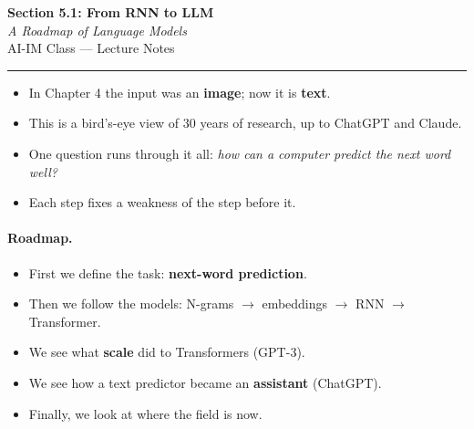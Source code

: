 \documentclass[12pt, a4paper]{article}
\begin{document}
\begin{center}
  {\LARGE \textbf{Section 5.1: From RNN to LLM}} \\[0.3em]
  {\large\itshape A Roadmap of Language Models} \\[0.5em]
  {\large AI-IM Class --- Lecture Notes}%
  \ifstudentmode
  \fi
\end{center}

\vspace{1em}
\hrule
\vspace{1.5em}

\begin{itemize}
  \item In Chapter 4 the input was an \textbf{image}; now it is
        \textbf{text}.
  \item This is a bird's-eye view of 30 years of research, up to ChatGPT
        and Claude.
  \item One question runs through it all:
        \emph{how can a computer predict the next word well?}
  \item Each step fixes a weakness of the step before it.
\end{itemize}

\paragraph{Roadmap.}
\begin{itemize}
  \item First we define the task: \textbf{next-word prediction}.
  \item Then we follow the models: N-grams $\to$ embeddings $\to$ RNN $\to$
        Transformer.
  \item We see what \textbf{scale} did to Transformers (GPT-3).
  \item We see how a text predictor became an \textbf{assistant} (ChatGPT).
  \item Finally, we look at where the field is now.
\end{itemize}
\end{document}
